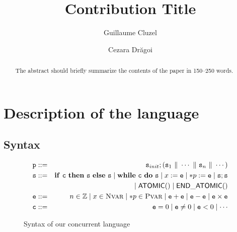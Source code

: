 \documentclass[runningheads]{llncs}
\newcommand\prule{\mathtt{p}}
\newcommand\srule{\mathtt{s}}
\newcommand{\erule}{\mathtt{e}}
\newcommand{\crule}{\mathtt{c}}
\newcommand{\ifinst}{\mathbf{if}}
\newcommand{\theninst}{\mathbf{then}}
\newcommand{\elseinst}{\mathbf{else}}
\newcommand{\whileinst}{\mathbf{while}}
\newcommand{\doinst}{\mathbf{do}}
\newcommand{\atomicbegin}{\mathsf{ATOMIC()}}
\newcommand{\atomicend}{\mathsf{END\_ATOMIC()}}
\newcommand{\Integer}{\mathbb Z}
\newcommand{\parallelcomposition}{\Vert}
\begin{document}
\title{Contribution Title}
%
%
\author{Guillaume Cluzel \and
Cezara Dr\u{a}goi}
%
%
%
\maketitle              %
%
\begin{abstract}
The abstract should briefly summarize the contents of the paper in
150--250 words.

\end{abstract}








  
   


  
  
  \section{Description of the language}
  \label{sec:syntax}
 
  \subsection{Syntax}
  
    \begin{figure}
    \begin{eqnarray*}
      \prule & ::= & \srule_{init} ; (\srule_1 \ \parallelcomposition \ \cdots \ \parallelcomposition \ \srule_n \ \parallelcomposition \ \cdots)\\
      \srule & ::= & \ifinst\ \crule\ \theninst \ {\srule} \ \elseinst \ {\srule} \mid 
      				\whileinst \ \crule \ \doinst \ {\srule} \mid 
      				x := \erule \mid *p := \erule \mid
      				\srule ; \srule \\
      				& & \mid \atomicbegin \mid \atomicend \\
      \erule & ::= & n \in \Integer \mid x \in \nvars \mid *p \in \pvars \mid
      			  \erule + \erule \mid \erule - \erule \mid \erule \times \erule \\
      \crule & ::= & \erule = 0 \mid \erule \neq 0 \mid \erule < 0 \mid \cdots
    \end{eqnarray*}
    \caption{Syntax of our concurrent language}
    \label{fig:syntax}
  \end{figure}
 
\end{document}
